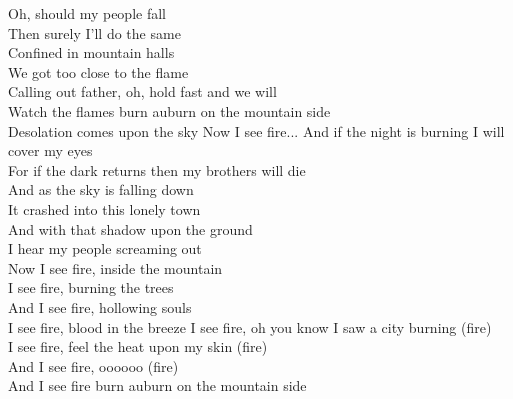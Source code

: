 Oh, should my people fall\tab{}\tab{}\\
Then surely I'll do the same\tab{}\tab{}\\
Confined in mountain halls\tab{}\tab{}\\
We got too close to the flame\tab{}\tab{}\\
Calling out father, oh, hold fast and we will\tab{}\\
Watch the flames burn auburn on the mountain side\\
Desolation comes upon the sky\tab{}\tab{}
 \hops
{} Now I see fire...
\hops
And if the night is burning I will cover my eyes\\
For if the dark returns then my brothers will die\\
And as the sky is falling down\tab{}\tab{}\\
It crashed into this lonely town\tab{}\\
And with that shadow upon the ground \tab{}\\
 I hear my people screaming out\tab{}\\
\hops
{} Now I see fire,  inside the mountain \tab{}\\
 I see fire,  burning the trees\tab{}\\
 And I see fire,  hollowing souls\tab{}\\
 I see fire,  blood in the breeze\tab{}
\hop
{} I see fire, oh you know I saw a city burning (fire)\\
 I see fire, feel the heat upon my skin (fire)\\
 And I see fire, oooooo (fire)\tab{}\\
 And I see fire burn auburn on the mountain side\\